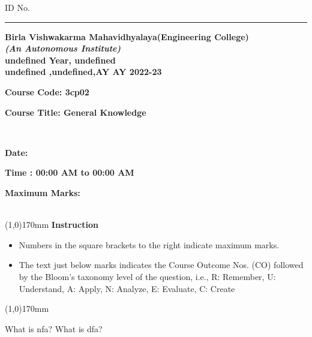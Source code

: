 \documentclass[addpoints,12pt]{exam}
\begin{document}
    \hspace{-7mm}ID No.\rule{20mm}{0.3mm}
    \begin{center}
 \textbf{Birla Vishwakarma Mahavidhyalaya(Engineering College)} \\
  \textbf{\textit{(An Autonomous Institute)}} \\
  \textbf{undefined Year, undefined} \\
  \textbf{undefined ,undefined,AY AY 2022-23} \\
  \vspace{4mm}
 
 
  \end{center}
 
  \hspace{-7mm}
  \parbox[t]{50mm}{\textbf{Course Code: 3cp02}}
  \parbox[t]{100mm}{\textbf{Course Title: General Knowledge}}\vspace{2mm}\\
  \parbox[t]{50mm}{\textbf{Date: }}
  \parbox[t]{75mm}{\textbf{Time : 00:00 AM to 00:00 AM}}
  \parbox[t]{50mm}{\textbf{Maximum Marks: }}\\
  \line(1,0){170mm} \vspace{2mm}
  \hspace{-6mm}\textbf{Instruction}

 

  \begin{itemize}[leftmargin=4mm,rightmargin=-2cm]
      \item Numbers in the square brackets to the right indicate maximum marks.
     
      \item The text just below marks indicates the Course Outcome Nos. (CO) followed by the Bloom’s taxonomy level of the question, i.e., R: Remember, U: Understand, A: Apply, N: Analyze, E: Evaluate, C: Create
  \end{itemize}
  \line(1,0){170mm}
 \vspace{5mm}
\begin{questions}
\pointname{}
\pointsinrightmargin
{}\question[5]
What is nfa?
\question[5]
What is dfa?
\end{questions}
\end{document}
